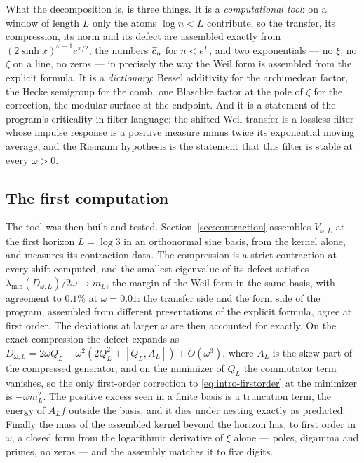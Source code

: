 What the decomposition is, is three things. It is a \emph{computational tool}:
on a window of length $L$ only the atoms $\log n<L$ contribute, so the
transfer, its compression, its norm and its defect are assembled exactly from
$(2\sinh x)^{\omega-1}e^{x/2}$, the numbers $\widetilde c_n$ for $n<e^L$, and two
exponentials --- no $\xi$, no $\zeta$ on a line, no zeros --- in precisely the
way the Weil form is assembled from the explicit formula. It is a
\emph{dictionary}: Bessel additivity for the archimedean factor, the Hecke
semigroup for the comb, one Blaschke factor at the pole of $\zeta$ for the
correction, the modular surface at the endpoint. And it is a statement of the
program's criticality in filter language: the shifted Weil transfer is a
lossless filter whose impulse response is a positive measure minus twice its
exponential moving average, and the Riemann hypothesis is the statement that
this filter is stable at every $\omega>0$.

\subsection{The first computation}

The tool was then built and tested. Section~\ref{sec:contraction} assembles
$V_{\omega,L}$ at the first horizon $L=\log3$ in an orthonormal sine basis,
from the kernel alone, and measures its contraction data. The compression is a
strict contraction at every shift computed, and the smallest eigenvalue of its
defect satisfies $\lambda_{\min}(D_{\omega,L})/2\omega\to m_L$, the margin of
the Weil form in the same basis, with agreement to $0.1\%$ at $\omega=0.01$:
the transfer side and the form side of the program, assembled from different
presentations of the explicit formula, agree at first order. The deviations at
larger $\omega$ are then accounted for exactly. On the exact compression the
defect expands as $D_{\omega,L}=2\omega Q_L-\omega^2(2Q_L^2+[Q_L,A_L])+O(\omega^3)$,
where $A_L$ is the skew part of the compressed generator, and on the minimizer
of $Q_L$ the commutator term vanishes, so the only first-order correction to
\eqref{eq:intro-firstorder} at the minimizer is $-\omega m_L^2$. The positive
excess seen in a finite basis is a truncation term, the energy of $A_Lf$
outside the basis, and it dies under nesting exactly as predicted. Finally the
mass of the assembled kernel beyond the horizon has, to first order in
$\omega$, a closed form from the logarithmic derivative of $\xi$ alone ---
poles, digamma and primes, no zeros --- and the assembly matches it to five
digits.

